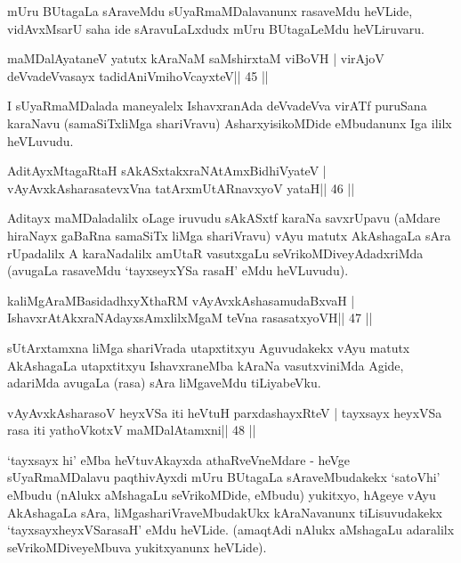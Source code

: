 \begin{artha}
mUru BUtagaLa sAraveMdu sUyaRmaMDalavanunx rasaveMdu heVLide, vidAvxMsarU saha ide sAravuLaLxdudx mUru BUtagaLeMdu heVLiruvaru.
\end{artha}

\begin{shl}
maMDalAyataneV yatutx kAraNaM saMshirxtaM viBoVH |
virAjoV deVvadeVvasayx tadidAniVmihoVcayxteV\hfill || 45 ||
\end{shl}

\begin{artha}
I sUyaRmaMDalada maneyalelx IshavxranAda deVvadeVva virATf puruSana karaNavu (samaSiTxliMga shariVravu) AsharxyisikoMDide eMbudanunx Iga ililx heVLuvudu.
\end{artha}

\begin{shl}
AditAyxMtagaRtaH sAkASxtakxraNAtAmx\s BidhiVyateV |
vAyAvxkAsharasatevxVna tatArxmUtARnavxyoV yataH\hfill || 46 ||
\end{shl}

\begin{artha}
Aditayx maMDaladalilx oLage iruvudu sAkASxtf karaNa savxrUpavu (aMdare hiraNayx gaBaRna samaSiTx liMga shariVravu) vAyu matutx AkAshagaLa sAra rUpadalilx A karaNadalilx amUtaR vasutxgaLu seVrikoMDiveyAdadxriMda (avugaLa rasaveMdu `tayxseyxYSa rasaH' eMdu heVLuvudu).
\end{artha}

\begin{shl}
kaliMgAraMBasidadhxyXthaRM vAyAvxkAshasamudaBxvaH |
IshavxrAtAkxraNAdayxsAmxlilxMgaM teVna rasasatxyoVH\hfill || 47 ||
\end{shl}

\begin{artha}
sUtArxtamxna liMga shariVrada utapxtitxyu Aguvudakekx vAyu matutx AkAshagaLa utapxtitxyu IshavxraneMba kAraNa vasutxviniMda Agide, adariMda avugaLa (rasa) sAra liMgaveMdu tiLiyabeVku.
\end{artha}

\begin{shl}
vAyAvxkAsharasoV heyxVSa iti heVtuH parxdashayxRteV |
tayxsayx heyxVSa rasa iti yathoVkotxV maMDalAtamxni\hfill || 48 ||
\end{shl}

\begin{artha}
`tayxsayx hi' eMba heVtuvAkayxda athaRveVneMdare - heVge sUyaRmaMDalavu paqthivAyxdi mUru BUtagaLa sAraveMbudakekx `satoVhi' eMbudu (nAlukx aMshagaLu seVrikoMDide, eMbudu) yukitxyo, hAgeye vAyu AkAshagaLa sAra, liMgashariVraveMbudakUkx kAraNavanunx tiLisuvudakekx `tayxsayxheyxVSarasaH' eMdu heVLide. (amaqtAdi nAlukx aMshagaLu adaralilx seVrikoMDiveyeMbuva yukitxyanunx heVLide).
\end{artha}

